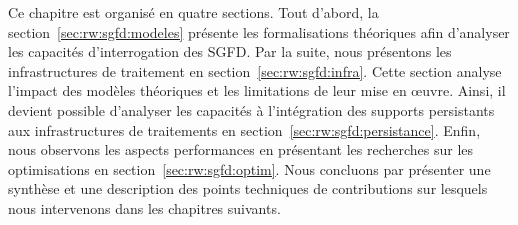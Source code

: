 Ce chapitre est organisé en quatre sections. Tout d'abord, la section~\ref{sec:rw:sgfd:modeles} présente les formalisations théoriques afin d'analyser les capacités d'interrogation des SGFD. Par la suite, nous présentons les infrastructures de traitement en section~\ref{sec:rw:sgfd:infra}. Cette section analyse l'impact des modèles théoriques et les limitations de leur mise en œuvre. Ainsi, il devient possible d'analyser les capacités à l'intégration des supports persistants aux infrastructures de traitements en section~\ref{sec:rw:sgfd:persistance}. Enfin, nous observons les aspects performances en présentant les recherches sur les optimisations en section~\ref{sec:rw:sgfd:optim}. Nous concluons par présenter une synthèse et une description des points techniques de contributions sur lesquels nous intervenons dans les chapitres suivants.






